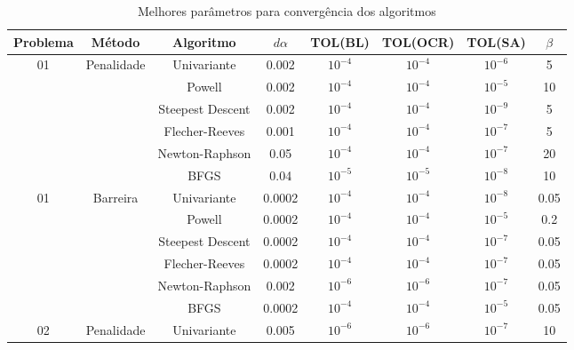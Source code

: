 \documentclass[10pt, a4paper]{article}
\begin{document}
\begin{table}[H]
      \small
      \centering
      \caption{Melhores par\^ametros para converg\^encia dos algoritmos}
      \begin{tabular}{c|c|c|c|c|c|c|c}
            Problema & M\'etodo & Algoritmo & $d\alpha$ & TOL(BL) & TOL(OCR) & TOL(SA) & $\beta$\\
            \hline
            \multirow{6}{*}{01} & \multirow{6}{*}{Penalidade} & Univariante       & 0.002 & $10^{-4}$ & $10^{-4}$ & $10^{-6}$ & 5   \\
                                                            & & Powell            & 0.002 & $10^{-4}$ & $10^{-4}$ & $10^{-5}$ & 10  \\
                                                            & & Steepest Descent  & 0.002 & $10^{-4}$ & $10^{-4}$ & $10^{-9}$ & 5   \\
                                                            & & Flecher-Reeves    & 0.001 & $10^{-4}$ & $10^{-4}$ & $10^{-7}$ & 5   \\
                                                            & & Newton-Raphson    & 0.05  & $10^{-4}$ & $10^{-4}$ & $10^{-7}$ & 20  \\
                                                            & & BFGS              & 0.04  & $10^{-5}$ & $10^{-5}$ & $10^{-8}$ & 10  \\
            \hline
            \multirow{6}{*}{01} & \multirow{6}{*}{Barreira} & Univariante         & 0.0002 & $10^{-4}$ & $10^{-4}$ & $10^{-8}$ & 0.05 \\
                                                            & & Powell            & 0.0002 & $10^{-4}$ & $10^{-4}$ & $10^{-5}$ & 0.2  \\
                                                            & & Steepest Descent  & 0.0002 & $10^{-4}$ & $10^{-4}$ & $10^{-7}$ & 0.05 \\
                                                            & & Flecher-Reeves    & 0.0002 & $10^{-4}$ & $10^{-4}$ & $10^{-7}$ & 0.05 \\
                                                            & & Newton-Raphson    & 0.002  & $10^{-6}$ & $10^{-6}$ & $10^{-7}$ & 0.05 \\
                                                            & & BFGS              & 0.0002 & $10^{-4}$ & $10^{-4}$ & $10^{-5}$ & 0.05 \\
            \hline
            \multirow{6}{*}{02} & \multirow{6}{*}{Penalidade} & Univariante       & 0.005  & $10^{-6}$ & $10^{-6}$ & $10^{-7}$ & 10 \\

\end{tabular}
\end{table}
\end{document}
